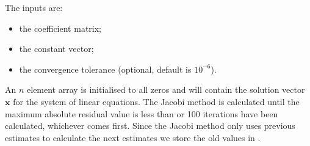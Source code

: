 \documentclass[letterpaper,10pt,english]{jupyterBook}
\begin{document}
\sphinxAtStartPar
The inputs are:
\begin{itemize}
\item {} 
\sphinxAtStartPar
{} \sphinxhyphen{} the coefficient matrix;

\item {} 
\sphinxAtStartPar
{} \sphinxhyphen{} the constant vector;

\item {} 
\sphinxAtStartPar
{} \sphinxhyphen{} the convergence tolerance (optional, default is \(10^{-6}\)).

\end{itemize}

\sphinxAtStartPar
An \(n\) element array  is initialised to all zeros and will contain the solution vector \(\mathbf{x}\) for the system of linear equations. The Jacobi method is calculated until the maximum absolute residual value is less than  or 100 iterations have been calculated, whichever comes first. Since the Jacobi method only uses previous estimates to calculate the next estimates we store the old values in .
\end{document}
